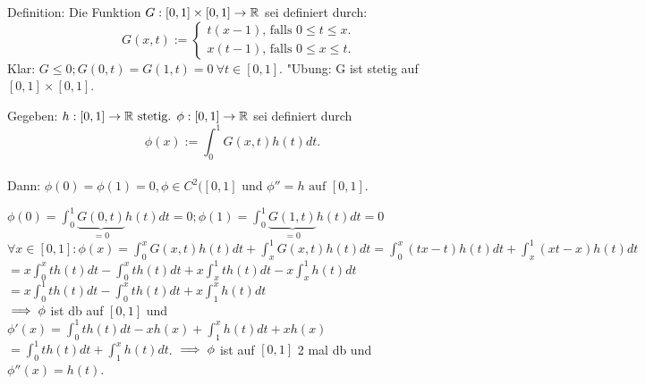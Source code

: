 \documentclass[a4paper,twoside,DIV15,BCOR12mm]{scrbook}
\begin{document}
Definition: Die Funktion $G:[0,1]\times[0,1]\to\mathbb{R}$ sei definiert durch: 
\[ \quad
G(x,t):=
\begin{cases}
t(x-1)\text{, falls } 0\le t\le x\text{.}\\
x(t-1)\text{, falls } 0\le x\le t\text{.}
\end{cases} \]
Klar: $G\le0; G(0,t)=G(1,t)=0\ \forall t\in[0,1]$.
"Ubung: G ist stetig auf $[0,1]\times[0,1]$.

\begin{wichtigerhilfssatz}
Gegeben: $h:[0,1]\to\mathbb{R} \text{ stetig. } \phi:[0,1]\to\mathbb{R}$ sei definiert durch 
$$ \phi(x) := \int_0^1G(x,t)h(t)dt\text{.}$$ \\
Dann: $ \phi(0)=\phi(1)=0, \phi\in C^2([0,1]$ und $\phi''=h\text{ auf }[0,1]$.\\
\end{wichtigerhilfssatz}
\begin{beweis}
$\phi(0) = \int_0^1\underbrace{G(0,t)}_{=0}h(t)dt = 0;\phi(1)=\int_0^1\underbrace{G(1,t)}_{=0}h(t)dt=0$\\
$\forall x\in[0,1]: \phi(x)=\int_0^xG(x,t)h(t)dt+\int_x^1G(x,t)h(t)dt=\int_0^x(tx-t)h(t)dt+\int_x^1(xt-x)h(t)dt$\\
$=x\int_0^x th(t)dt-\int_0^x th(t)dt+x\int_x^1 th(t)dt-x\int_x^1 h(t)dt$\\
$=x\int_0^1 th(t)dt-\int_0^xth(t)dt+x\int_1^xh(t)dt$\\
$\implies \phi$ ist db auf $[0,1]$ und $\phi'(x)=\int_0^1th(t)dt-xh(x)+\int_1^xh(t)dt+xh(x)$\\
$=\int_0^1th(t)dt+\int_1^xh(t)dt$.
$\implies \phi$ ist auf $[0,1]$ 2 mal db und $\phi''(x) =h(t)$.
\end{beweis}
\end{document}
